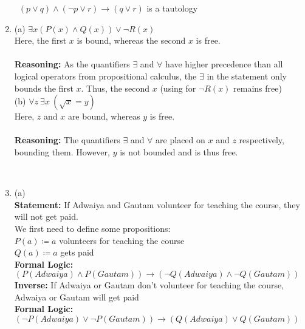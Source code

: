\documentclass[a4paper]{article}
\begin{document}
\begin{enumerate}
\begin{center}
        \end{center}

        \therefore \ $(p \lor q) \land (\neg p \lor r) \rightarrow (q \lor r)$ is a tautology \\

        \item (a) $\exists x \left(P(x) \land Q(x)\right) \lor \neg R(x)$ \\
        Here, the first $x$ is bound, whereas the second $x$ is free. \\
        \vspace{0in}\\
        \textbf{Reasoning:} As the quantifiers $\exists$ and $\forall$ have higher precedence than all logical operators from propositional calculus, the $\exists$ in the statement only bounds the first $x$. Thus, the second $x$ (using for $\neg R(x)$ remains free)
        \\
        
        (b) $\forall z \ \exists x \ \left(\sqrt{x} = y\right)$ \\
        Here, $z$ and $x$ are bound, whereas $y$ is free. \\
        \vspace{0in}\\
        \textbf{Reasoning:} The quantifiers $\exists$ and $\forall$ are placed on $x$ and $z$ respectively, bounding them. However, $y$ is not bounded and is thus free.

        \\

\item (a)\\
\textbf{Statement:} If Adwaiya and Gautam volunteer for teaching the course, they will not get paid.\\

We first need to define some propositions:\\
$P(a) \coloneqq a$ volunteers for teaching the course \\
$Q(a) \coloneqq a$ gets paid\\

\textbf{Formal Logic:} $\left(P(Adwaiya) \land P(Gautam)\right) \rightarrow \left(\neg Q(Adwaiya) \land \neg Q(Gautam)\right)$\\


\textbf{Inverse:} If Adwaiya or Gautam don't volunteer for teaching the course, Adwaiya or Gautam will get paid\\
\textbf{Formal Logic:} $\left(\neg P(Adwaiya) \lor \neg P(Gautam)\right) \rightarrow \left(Q(Adwaiya) \lor Q(Gautam)\right)$\\


\end{enumerate}
\end{document}
